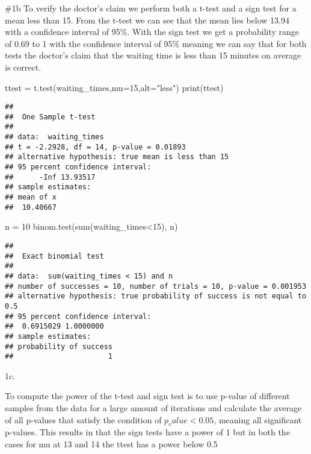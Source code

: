 \documentclass[
]{article}
\newenvironment{Shaded}{\begin{snugshade}}{\end{snugshade}}
\newcommand{\AttributeTok}[1]{\textcolor[rgb]{0.77,0.63,0.00}{#1}}
\newcommand{\DecValTok}[1]{\textcolor[rgb]{0.00,0.00,0.81}{#1}}
\newcommand{\FunctionTok}[1]{\textcolor[rgb]{0.00,0.00,0.00}{#1}}
\newcommand{\NormalTok}[1]{#1}
\newcommand{\OtherTok}[1]{\textcolor[rgb]{0.56,0.35,0.01}{#1}}
\newcommand{\SpecialCharTok}[1]{\textcolor[rgb]{0.00,0.00,0.00}{#1}}
\newcommand{\StringTok}[1]{\textcolor[rgb]{0.31,0.60,0.02}{#1}}
\begin{document}
\#1b To verify the doctor's claim we perform both a t-test and a sign
test for a mean less than 15. From the t-test we can see that the mean
lies below 13.94 with a confidence interval of 95\%. With the sign test
we get a probability range of 0.69 to 1 with the confidence interval of
95\% meaning we can say that for both tests the doctor's claim that the
waiting time is less than 15 minutes on average is correct.

\begin{Shaded}
\begin{Highlighting}[]
\NormalTok{ttest }\OtherTok{=} \FunctionTok{t.test}\NormalTok{(waiting\_times,}\AttributeTok{mu=}\DecValTok{15}\NormalTok{,}\AttributeTok{alt=}\StringTok{"less"}\NormalTok{)}
\FunctionTok{print}\NormalTok{(ttest)}
\end{Highlighting}
\end{Shaded}

\begin{verbatim}
## 
##  One Sample t-test
## 
## data:  waiting_times
## t = -2.2928, df = 14, p-value = 0.01893
## alternative hypothesis: true mean is less than 15
## 95 percent confidence interval:
##      -Inf 13.93517
## sample estimates:
## mean of x 
##  10.40667
\end{verbatim}

\begin{Shaded}
\begin{Highlighting}[]
\NormalTok{n }\OtherTok{=} \DecValTok{10}
\FunctionTok{binom.test}\NormalTok{(}\FunctionTok{sum}\NormalTok{(waiting\_times}\SpecialCharTok{\textless{}}\DecValTok{15}\NormalTok{), n)}
\end{Highlighting}
\end{Shaded}

\begin{verbatim}
## 
##  Exact binomial test
## 
## data:  sum(waiting_times < 15) and n
## number of successes = 10, number of trials = 10, p-value = 0.001953
## alternative hypothesis: true probability of success is not equal to 0.5
## 95 percent confidence interval:
##  0.6915029 1.0000000
## sample estimates:
## probability of success 
##                      1
\end{verbatim}

1c.

To compute the power of the t-test and sign test is to use p-value of
different samples from the data for a large amount of iterations and
calculate the average of all p-values that satisfy the condition of
\(p_value < 0.05\), meaning all significant p-values. This results in
that the sign tests have a power of 1 but in both the cases for mu at 13
and 14 the ttest has a power below 0.5
\end{document}

